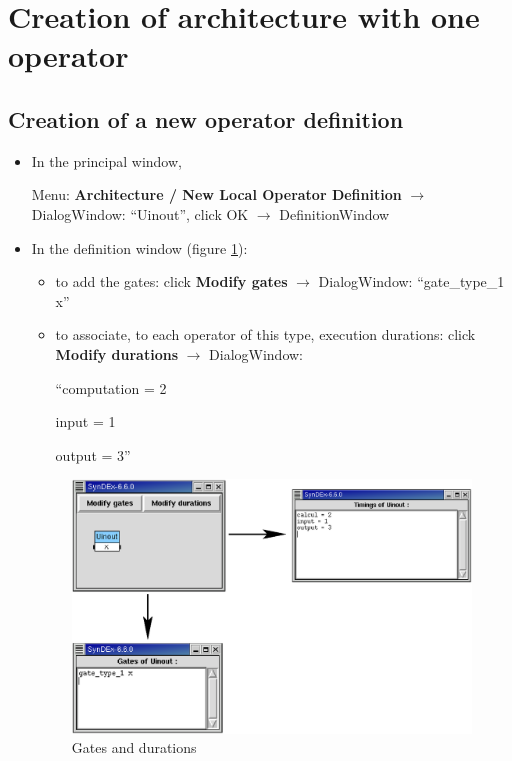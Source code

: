 \documentclass[a4paper,twoside]{report}
\begin{document}
\section{Creation of architecture with one operator}
\label{archi1u_ex1}
\subsection{Creation of a new operator definition}
\label{operator}
\begin{itemize}
\item In the principal window, 

Menu: \textbf{Architecture / New Local Operator Definition}
$\rightarrow$ DialogWindow: ``Uinout'', click OK $\rightarrow$ DefinitionWindow

\item In the definition window (figure \ref{archi}):
\begin{itemize}
\item to add the gates: click \textbf{Modify gates} $\rightarrow$ DialogWindow:
``gate\_type\_1 x''
\item to associate, to each operator of this type, execution durations: click \textbf{Modify
durations} $\rightarrow$ DialogWindow: 

``computation = 2 
 
\hspace{4pt}input = 1 

\hspace{4pt}output = 3''
\end{itemize}

\begin{figure}[htbp]
  \begin{center} 
        \includegraphics[width=\linewidth]{archi.eps} 
  \end{center}
  \caption{Gates and durations} 
  \label{archi}
\end{figure}

\end{itemize}
\end{document}
